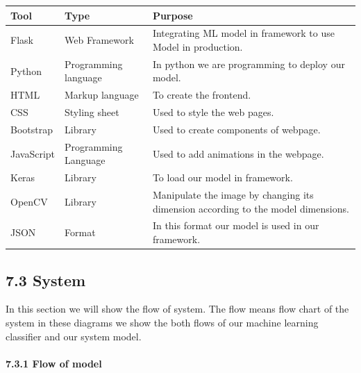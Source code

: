\documentclass{article} %
\begin{document}
\begin{tabular}{|p{0.7in}|p{1.1in}|p{2.5in}|} \hline 
\textbf{Tool} & \textbf{Type} & \textbf{Purpose} \\ \hline 
Flask & Web Framework & Integrating ML model in framework to use Model in production. \\ \hline 
Python & Programming language & In python we are programming to deploy our model. \\ \hline 
HTML & Markup language  & To create the frontend. \\ \hline 
CSS & Styling sheet & Used to style the web pages. \\ \hline 
Bootstrap & Library & Used to create components of webpage. \\ \hline 
JavaScript & Programming Language & Used to add animations in the webpage. \\ \hline 
Keras & Library & To load our model in framework. \\ \hline 
OpenCV & Library & Manipulate the image by changing its dimension according to the model dimensions. \\ \hline 
JSON & Format & In this format our model is used in our framework. \\ \hline 
\end{tabular}



\noindent 
\subsection{7.3 System}

\noindent In this section we will show the flow of system. The flow means flow chart of the system in these diagrams we show the both flows of our machine learning classifier and our system model.

\noindent 
\paragraph{7.3.1 Flow of model}
\end{document}
